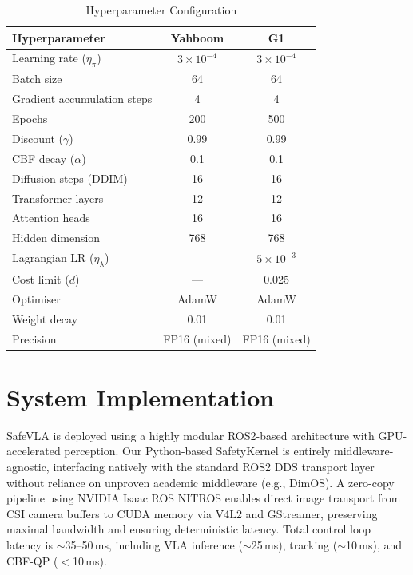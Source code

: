 \documentclass[10pt,twocolumn]{article}
\begin{document}
\begin{table}[h]
\centering
\caption{Hyperparameter Configuration}
\label{tab:hyper}
\begin{tabular}{@{}lcc@{}}
\toprule
\textbf{Hyperparameter} & \textbf{Yahboom} & \textbf{G1} \\
\midrule
Learning rate ($\eta_\pi$) & $3 \times 10^{-4}$ & $3 \times 10^{-4}$ \\
Batch size & 64 & 64 \\
Gradient accumulation steps & 4 & 4 \\
Epochs & 200 & 500 \\
Discount ($\gamma$) & 0.99 & 0.99 \\
CBF decay ($\alpha$) & 0.1 & 0.1 \\
Diffusion steps (DDIM) & 16 & 16 \\
Transformer layers & 12 & 12 \\
Attention heads & 16 & 16 \\
Hidden dimension & 768 & 768 \\
Lagrangian LR ($\eta_\lambda$) & --- & $5 \times 10^{-3}$ \\
Cost limit ($d$) & --- & 0.025 \\
Optimiser & AdamW & AdamW \\
Weight decay & 0.01 & 0.01 \\
Precision & FP16 (mixed) & FP16 (mixed) \\
\bottomrule
\end{tabular}
\end{table}

\section{System Implementation}
\label{sec:system}

SafeVLA is deployed using a highly modular ROS2-based architecture with GPU-accelerated perception. Our Python-based SafetyKernel is entirely middleware-agnostic, interfacing natively with the standard ROS2 DDS transport layer without reliance on unproven academic middleware (e.g., DimOS). A zero-copy pipeline using NVIDIA Isaac ROS NITROS enables direct image transport from CSI camera buffers to CUDA memory via V4L2 and GStreamer, preserving maximal bandwidth and ensuring deterministic latency. Total control loop latency is $\sim$35--50\,ms, including VLA inference ($\sim$25\,ms), tracking ($\sim$10\,ms), and CBF-QP ($<$10\,ms).
\end{document}

